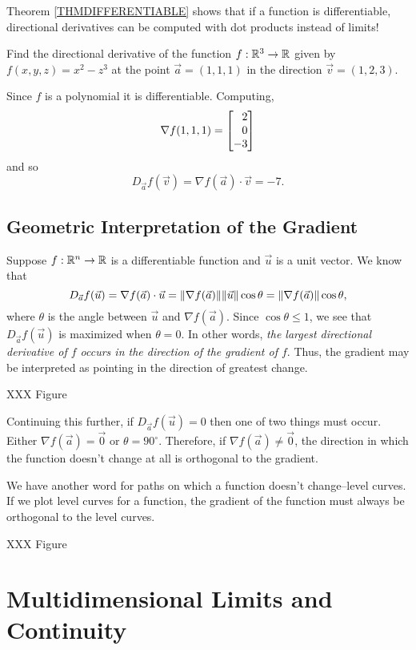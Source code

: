 Theorem \ref{THMDIFFERENTIABLE} shows that if a function is differentiable,
directional derivatives can be computed with dot products instead of limits!

\begin{example}
	Find the directional derivative of the function $f:\mathbb{R}^3\to\mathbb{R}$
	given by $f(x,y,z)=x^2-z^3$ at the point $\vec a=(1,1,1)$ in the direction
	$\vec v=(1,2,3)$.

	Since $f$ is a polynomial it is differentiable.  Computing,
	\[
		\nabla f(1,1,1) = \mat{2\\0\\-3}
	\]
	and so
	\[
		D_{\vec a}f(\vec v) = \nabla f(\vec a)\cdot \vec v=-7.
	\]
\end{example}

\subsection{Geometric Interpretation of the Gradient}

Suppose $f:\mathbb{R}^n\to \mathbb{R}$ is a differentiable function and $\vec u$ is
a unit vector.  We know that
\[
	D_{\vec a}f(\vec u) = \nabla f(\vec a)\cdot \vec u = 
	\lVert\nabla f(\vec a)\rVert\lVert\vec u\rVert\cos\theta=\lVert\nabla f(\vec a)\rVert\cos\theta,
\]
where $\theta$ is the angle between $\vec u$ and $\nabla f(\vec a)$.
Since $\cos \theta \leq 1$,
we see that $D_{\vec a}f(\vec u)$ is maximized when $\theta=0$.  In other words,
\emph{the largest directional derivative 
of $f$ occurs in the direction of the gradient of $f$}.  Thus, the gradient may be interpreted
as pointing in the direction of greatest change.

XXX Figure

Continuing this further, if $D_{\vec a}f(\vec u)=0$ then one of two things 
must occur.  Either $\nabla f(\vec a)=\vec 0$ or $\theta=90^{\circ}$.  Therefore,
if $\nabla f(\vec a)\neq \vec 0$, the direction in which the function doesn't
change at all is orthogonal to the gradient.

We have another word for paths on which a function doesn't change--level curves.
If we plot level curves for a function, the gradient of the function must always be
orthogonal to the level curves.

XXX Figure


\begin{exercises}
\end{exercises}

\section{Multidimensional Limits and Continuity}

